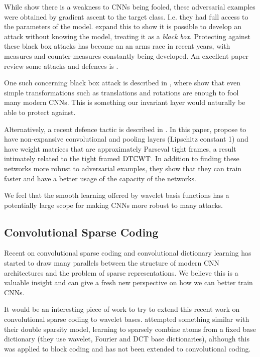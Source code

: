 While \citeauthor{szegedy_intriguing_2014} \cite{szegedy_intriguing_2014} show
there is a weakness to CNNs being fooled, these adversarial examples were
obtained by gradient ascent to the target class. I.e. they had full access to
the parameters of the model. \citeauthor{papernot_practical_2017} \cite{papernot_practical_2017} expand this to show
it is possible to develop an attack without knowing the model, treating it as a
\emph{black box}. Protecting against these black box attacks has become an 
an arms race in recent years, with measures and counter-measures constantly
being developed. An excellent paper review some attacks and
defences is \cite{carlini_adversarial_2017}. 

One such concerning black box attack is described in \cite{engstrom_rotation_2017}, where
\citeauthor{engstrom_rotation_2017} show that even simple transformations such
as translations and rotations are enough to fool many modern CNNs. This is
something our invariant layer would naturally be able to protect against.

Alternatively, a recent defence tactic is described in \cite{cisse_parseval_2017}. In
this paper, \citeauthor{cisse_parseval_2017} propose to have non-expansive
convolutional and pooling layers (Lipschitz constant 1) and have weight matrices
that are approximately Parseval tight frames, a result intimately related to
the tight framed $\mathrm{DT}\mathbb{C}\mathrm{WT}$. In addition to finding these
networks more robust to adversarial examples, they show that they can train
faster and have a better usage of the capacity of the networks. 

We feel that the smooth learning offered by wavelet basis functions has a potentially
large scope for making CNNs more robust to many attacks.

\subsection{Convolutional Sparse Coding}
Recent on convolutional sparse coding and convolutional
dictionary learning \cite{liu_online_2017, liu_first_2017,
papyan_convolutional_2016, papyan_convolutional_2017, papyan_theoretical_2018}
has started to draw many parallels between the
structure of modern CNN architectures and the problem of sparse
representations. We believe this is a valuable insight and can give a fresh new
perspective on how we can better train CNNs. 

It would be an interesting piece of work to try to extend this recent work on
convolutional sparse coding to wavelet bases. \cite{rubinstein_double_2010}
attempted something similar with their double sparsity model, learning to
sparsely combine atoms from a fixed base dictionary (they use wavelet, Fourier
and DCT base dictionaries), although this was applied to block coding and has
not been extended to convolutional coding.

